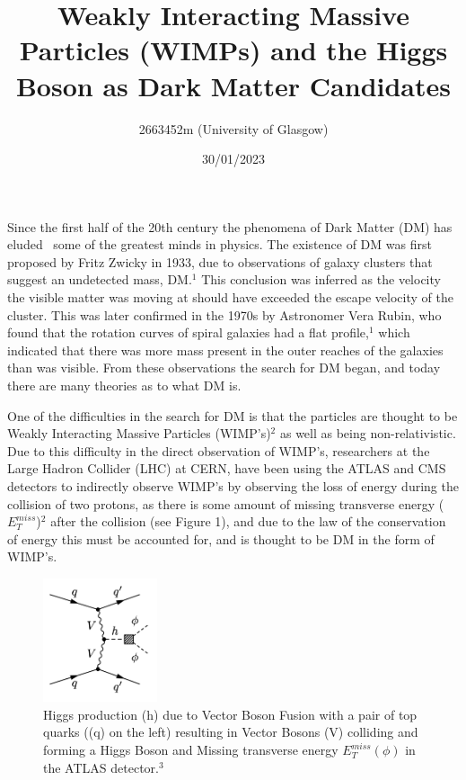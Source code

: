 \documentclass[]{article}
\title{\vspace{-8em}
\textbf{Weakly Interacting Massive Particles (WIMPs) 
and the Higgs Boson as Dark Matter Candidates }}
\author{2663452m (University of Glasgow)}
\date{30/01/2023}
\begin{document}
\maketitle
Since the first half of the 20th century the phenomena of Dark Matter (DM) has eluded \
some of the greatest minds in physics. The existence of DM was first 
proposed by Fritz Zwicky in 1933, due to observations of galaxy clusters that suggest
an undetected mass, DM.$^1$ This conclusion was inferred as the velocity the visible matter was
moving at should have exceeded the escape velocity of the cluster. 
This was later confirmed in the 1970s by Astronomer Vera Rubin, who found that
the rotation curves of spiral galaxies had a flat profile,$^1$ which indicated 
that there was more mass present in the outer reaches of the galaxies than 
was visible. From these observations the search for DM began, and today 
there are many theories as to what DM is.
\par


One of the difficulties in the search for DM is that the particles are thought 
to be Weakly Interacting Massive Particles (WIMP's)$^2$ as well as being non-relativistic.
Due to this difficulty in the direct observation of WIMP's, researchers
at the Large Hadron Collider (LHC) at CERN, have been using the ATLAS and CMS 
detectors to indirectly observe WIMP's by observing the loss of energy during the 
collision of two protons, as there is some amount of missing transverse energy ($E^{miss}_{T} $)$^2$
after the collision (see Figure 1), and due to the law of the conservation of energy
this must be accounted for, and is thought to be DM in the form of WIMP's. 



\begin{figure}[h]
\centering  
\includegraphics[width=0.3\textwidth]{images/Feynman Diagrams of missing Tranverse energy.png}
\caption{Higgs production (h) due to Vector Boson Fusion with a pair of top quarks ((q) on the left) resulting in Vector Bosons (V) colliding and forming a Higgs Boson and Missing transverse energy $E^{miss}_{T} (\phi)$ in the ATLAS detector.$^3$}
\label{fig:missing_energy}
\end{figure}
\end{document}
